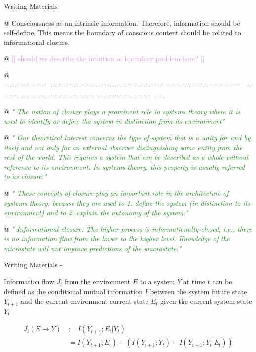 \documentclass[utf8]{article}
\newenvironment{WritingMaterials} %
    	{
            \begin{tcolorbox}[enhanced,
                title=-,
                size=small,
                colbacktitle=Aquamarine,
                drop fuzzy shadow,
                fontupper=\small,
                boxrule=0.4pt,
                colback=Aquamarine!10!white,
                sharp corners]
                Writing Materials
            \end{tcolorbox}
            \begin{easylist}[itemize]
    	}
    	{
            \end{easylist}  
            \begin{tcolorbox}[enhanced,
                halign=flush right,
                halign title=right,
                size=small,
                colbacktitle=Aquamarine,
                drop fuzzy shadow,
                fontupper=\small,
                boxrule=0.4pt,
                colback=Aquamarine,
                colupper=White,
                sharp corners]
                Writing Materials -
            \end{tcolorbox}        
    	}
\newcommand{\rewrite}[1]{\textcolor{ForestGreen}{\textit{"#1"}}\newline}
\newcommand{\idea}[2][Plum]{\noindent
				\textcolor{#1}{[[ #2 ]]}}
\begin{document}
		\begin{WritingMaterials}
			@ Consciousness as an intrinsic information. Therefore, information should be self-define. This means the boundary of conscious content should be related to informational closure.

			@ \idea{should we describe the intuition of boundary problem here?}

			@ ============================================================================


			@ \rewrite{
				The notion of closure plays a prominent role in systems theory where it is used to identify or define the system in distinction from its environment} \cite{BERTSCHINGER.2006}

			@ \rewrite{
				Our theoretical interest concerns the type of system that is a unity for and by itself and not only for an external observer distinguishing some entity from the rest of the world. This requires a system that can be described as a whole without reference to its environment. In systems theory, this property is usually referred to as closure.}\citep{BERTSCHINGER.2006}

			@ \rewrite{
				These concepts of closure play an important role in the architecture of systems
				theory, because they are used to
				1. define the system (in distinction to its environment) and to
				2. explain the autonomy of the system.}\citep{BERTSCHINGER.2006}

			@ \rewrite{
				Informational closure: The higher process is informationally closed, i.e., there is no information flow from the lower to the higher level. Knowledge of the microstate will not improve predictions of the macrostate.} \citep[p. 4]{PFANTE.2014}


		\end{WritingMaterials}


			\noindent
			Information flow $J_{t}$ from the environment $E$ to a system $Y$ at time $t$ can be defined as the conditional mutual information $I$ between the system future state $Y_{t+1}$ and the current environment current state $E_{t}$ given the current system state $Y_{t}$

				\begin{equation}
    				\label{eq:InformationFlow}
    				\left.\begin{array}
    				{rl}{J_{t}(E \rightarrow Y )} & {:= I(Y_{t+1};E_{t}|Y_{t})} \\
    				{ } & { \ = I(Y_{t+1};E_{t}) - (I(Y_{t+1};Y_{t})-I(Y_{t+1};Y_{t}|E_{t}))}
    				\end{array}\right.
				\end{equation}
\end{document}
